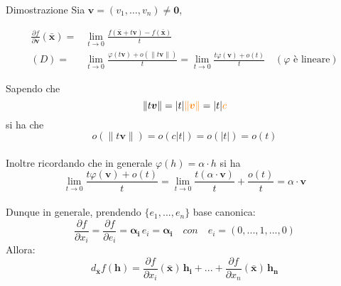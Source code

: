 \documentclass[x11names]{article}
\begin{document}
	\begin{es}{Dimostrazione}
		Sia \(\boldsymbol{v} = (v_{1},\dots,v_{n}) \neq \boldsymbol{0}\),
		
		\begin{align*}
			\frac{\partial f}{\partial \boldsymbol{v}}(\boldsymbol{\bar{x}}) =& \lim_{t\to 0} \frac{f(\boldsymbol{\bar{x}} + t\boldsymbol{v}) - f(\boldsymbol{\bar{x}})}{t} \\
			(D) =& \lim_{t\to 0} \frac{\varphi(t\boldsymbol{v})+o(\|t\boldsymbol{v}\|)}{t} = \lim_{t\to 0} \frac{t\varphi(\boldsymbol{v})+o(t)}{t} \quad (\varphi \text{ è lineare})
		\end{align*}
		
		Sapendo che
		\[ 
		\|t\boldsymbol{v}\| = |t| \textcolor{orange}{\|\boldsymbol{v}\|} = |t| \textcolor{orange}{c}
		\]
		si ha che
		\[ 
		o(\|t\boldsymbol{v}\|) = o(c|t|) = o(|t|) = o(t)
		\] \\
		
		Inoltre ricordando che in generale \(\varphi(h)=\alpha\cdot h\) si ha 
		\[
		\lim_{t\to 0} \frac{t\varphi(\boldsymbol{v})+o(t)}{t} = \lim_{t\to 0} \frac{t(\alpha\cdot \boldsymbol{v})}{t} + \frac{o(t)}{t} = \alpha\cdot \boldsymbol{v}
		\] \\
		
		Dunque in generale, prendendo $\{e_1,...,e_n\}$ base canonica:
		\[
		\frac{\partial f}{\partial x_i} = \frac{\partial f}{\partial e_i} = \boldsymbol{\alpha_i}\,e_i = \boldsymbol{\alpha_i} \quad con \quad e_i = (0,...,1,...,0)
		\]
		Allora: 
		\[
		d_{\boldsymbol{\bar{x}}} f(\boldsymbol{h}) = \frac{\partial f}{\partial x_i}(\boldsymbol{\bar{x}})\,\boldsymbol{h_i}+ ... + \frac{\partial f}{\partial x_n}(\boldsymbol{\bar{x}})\,\boldsymbol{h_n}
		\]
		
	\end{es}
	
\end{document}
